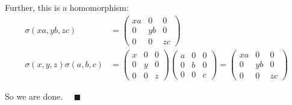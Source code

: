 \documentclass[12pt]{article}
\newcommand{\qed}{\quad \blacksquare}
\begin{document}
        Further, this is a homomorphism: 
        \begin{align*}
            \sigma(xa, yb, zc) &= \begin{pmatrix}
                xa & 0 & 0\\
                0 & yb & 0\\
                0 & 0 & zc
            \end{pmatrix}\\ 
            \sigma(x, y, z)\sigma(a, b, c) &= \begin{pmatrix}
                x & 0 & 0\\
                0 & y & 0\\
                0 & 0 & z
            \end{pmatrix}\begin{pmatrix}
                a & 0 & 0\\
                0 & b & 0\\
                0 & 0 & c
            \end{pmatrix} = \begin{pmatrix}
                xa & 0 & 0\\
                0 & yb & 0\\
                0 & 0 & zc
            \end{pmatrix}
        \end{align*}
        
        So we are done. $\qed$
    \color{black}
\end{document}
